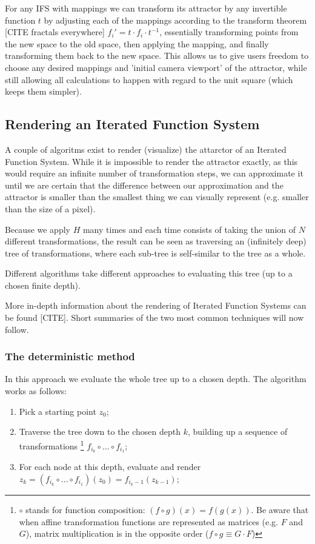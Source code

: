 \documentclass[11pt]{article}
\begin{document}
For any IFS with mappings we can transform its attractor by any invertible function \(t\) by adjusting each of the mappings according to the
transform theorem [CITE fractals everywhere] \(f_i' = t \cdot f_i \cdot t^{-1}\), essentially transforming points from the new space to the old space, then applying the mapping, and finally transforming them back to the new space. 
This allows us to give users freedom to choose any desired mappings and 'initial camera viewport' of the attractor,
while still allowing all calculations to happen with regard to the unit square (which keeps them simpler).

\subsection{Rendering an Iterated Function System}
\label{sec:orgb3f1037}

A couple of algoritms exist to render (visualize) the attarctor of an Iterated Function System. 
While it is impossible to render the attractor exactly, as this would require an infinite number of transformation steps,
we can approximate it until we are certain that the difference between our approximation and the attractor is smaller than
the smallest thing we can visually represent (e.g. smaller than the size of a pixel).

Because we apply \(H\) many times and each time consists of taking the union of \(N\) different transformations,
the result can be seen as traversing an (infinitely deep) tree of transformations, 
where each sub-tree is self-similar to the tree as a whole.

Different algorithms take different approaches to evaluating this tree (up to a chosen finite depth).

More in-depth information about the rendering of Iterated Function Systems can be found [CITE]. 
Short summaries of the two most common techniques will now follow.



\subsubsection{The deterministic method}
\label{sec:org9b05243}

In this approach we evaluate the whole tree up to a chosen depth. The algorithm works as follows:

\begin{enumerate}
\item Pick a starting point \(z_0\);
\item Traverse the tree down to the chosen depth \(k\), building up a sequence of transformations \footnote{\(\circ\) stands for function composition: \((f \circ g)(x) = f(g(x))\). 
Be aware that when affine transformation functions are represented as matrices (e.g. \(F\) and \(G\)), matrix multiplication is in the opposite order (\(f \circ g \equiv G \cdot F\))}
\(f_{i_k} \circ \ldots \circ f_{i_1}\);
\item For each node at this depth, evaluate and render \(z_k = (f_{i_k} \circ \ldots \circ f_{i_1})(z_0) = f_{i_k-1}(z_{k-1})\);
\end{enumerate}
\end{document}
